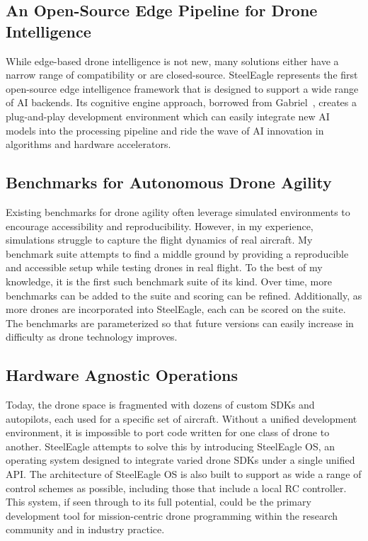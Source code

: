 \subsection{An Open-Source Edge Pipeline for Drone Intelligence}
While edge-based drone intelligence is not new, many solutions either have a narrow range of compatibility or are closed-source. SteelEagle represents the first open-source edge intelligence framework that is designed to support a wide range of AI backends. Its cognitive engine approach, borrowed from Gabriel~\cite{Ha2014}, creates a plug-and-play development environment which can easily integrate new AI models into the processing pipeline and ride the wave of AI innovation in algorithms and hardware accelerators. 

\subsection{Benchmarks for Autonomous Drone Agility}
Existing benchmarks for drone agility often leverage simulated environments to encourage accessibility and reproducibility. However, in my experience, simulations struggle to capture the flight dynamics of real aircraft. My benchmark suite attempts to find a middle ground by providing a reproducible and accessible setup while testing drones in real flight. To the best of my knowledge, it is the first such benchmark suite of its kind. Over time, more benchmarks can be added to the suite and scoring can be refined. Additionally, as more drones are incorporated into SteelEagle, each can be scored on the suite. The benchmarks are parameterized so that future versions can easily increase in difficulty as drone technology improves. 

\subsection{Hardware Agnostic Operations}
Today, the drone space is fragmented with dozens of custom SDKs and autopilots, each used for a specific set of aircraft. Without a unified development environment, it is impossible to port code written for one class of drone to another. SteelEagle attempts to solve this by introducing SteelEagle OS, an operating system designed to integrate varied drone SDKs under a single unified API. The architecture of SteelEagle OS is also built to support as wide a range of control schemes as possible, including those that include a local RC controller. This system, if seen through to its full potential, could be the primary development tool for mission-centric drone programming within the research community and in industry practice.

